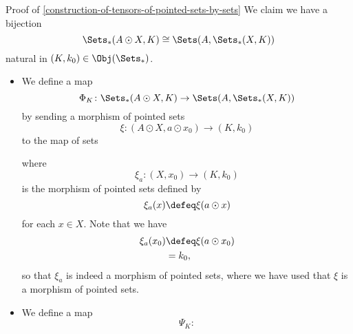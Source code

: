 \begin{Proof}{Proof of \cref{construction-of-tensors-of-pointed-sets-by-sets}}%
    We claim we have a bijection
    \[
        \Sets_{*}(A\odot X,K)%
        \cong%
        \Sets(A,\Sets_{*}(X,K))%
    \]%
    natural in $(K,k_{0})\in\Obj(\Sets_{*})$.%
    \begin{itemize}
        \item{}We define a map
            \[
                \Phi_{K}%
                \colon%
                \Sets_{*}(A\odot X,K)
                \to
                \Sets(A,\Sets_{*}(X,K))%
            \]%
            by sending a morphism of pointed sets
            \[
                \xi%
                \colon%
                (A\odot X,a\odot x_{0})%
                \to%
                (K,k_{0})%
            \]%
            to the map of sets%
            \begin{webcompile}
                \phantom{\xi^{\dagger}\colon}
            \end{webcompile}
            where
            \[
                \xi_{a}%
                \colon%
                (X,x_{0})%
                \to%
                (K,k_{0})%
            \]%
            is the morphism of pointed sets defined by
            \[
                \xi_{a}(x)%
                \defeq
                \xi(a\odot x)%
            \]%
            for each $x\in X$. Note that we have
            \begin{align*}
                \xi_{a}(x_{0}) &\defeq \xi(a\odot x_{0})\\%
                               &=      k_{0},%
            \end{align*}
            so that $\xi_{a}$ is indeed a morphism of pointed sets, where we have used that $\xi$ is a morphism of pointed sets.
        \item{}We define a map
            \[
                \Psi_{K}%
                \colon%
\]
\end{itemize}
\end{Proof}
